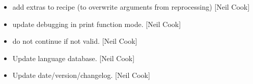 \documentclass[a4paper,10pt,english]{report}
\begin{document}
\begin{itemize}
\item {} 
 \sphinxhyphen{} add extras to recipe (to overwrite arguments
from reprocessing) {[}Neil Cook{]}

\item {} 
 \sphinxhyphen{} update debugging in print function mode. {[}Neil
Cook{]}

\item {} 
 \sphinxhyphen{} do not continue if not valid. {[}Neil Cook{]}

\item {} 
Update language database. {[}Neil Cook{]}

\item {} 
Update date/version/changelog. {[}Neil Cook{]}

\end{itemize}
\end{document}
